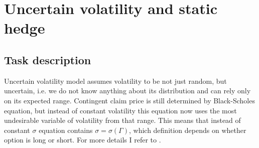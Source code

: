 \documentclass[11pt]{article} %
\begin{document}






\section{Uncertain volatility and static hedge}
\subsection{Task description}
Uncertain volatility model assumes volatility to be not just random, but uncertain, i.e. we do not know anything about its distribution and can rely only on its expected range. Contingent claim price is still determined by Black-Scholes equation, but instead of constant volatility this equation now uses the most undesirable variable of volatility from that range. This means that instead of constant $\sigma$ equation contains $\sigma = \sigma(\Gamma)$, which definition depends on whether option is long or short. For more details I refer to \cite[ch. 52 and 60]{PWoQF06}.
\end{document}
